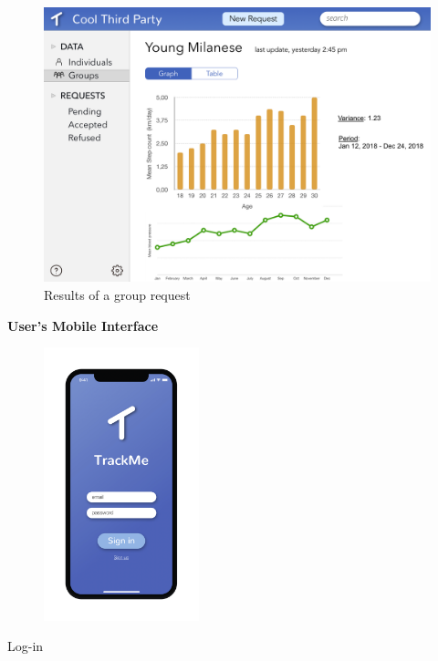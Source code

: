 \begin{figure}[H]
    \centering
    \includegraphics[scale=0.3]{Pictures/Mockup/web/stats.png}
    \caption{Results of a group request }
\end{figure}
\newpage
\textbf{User's Mobile Interface}
\begin{figure}[H]
    \centering
    \includegraphics[width=0.4\textwidth]{Pictures/Mockup/mobile/login.png}
    
\end{figure}
\hspace*{6.3cm}Log-in

